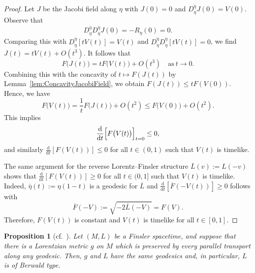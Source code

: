 \documentclass[a4paper,11pt]{article}
\numberwithin{equation}{section}
\theoremstyle{definition}
\theoremstyle{plain}
\newtheorem{proposition}[definition]{Proposition}
\newcommand{\dd}{\mathrm{d}}
\begin{document}
\begin{proof}
Let $J$ be the Jacobi field along $\eta$ with $J(0)=0$ and $D_{\dot{\eta}}^{\dot{\eta}} J(0)=V(0)$.
Observe that
\[ D_{\dot{\eta}}^{\dot{\eta}} D_{\dot{\eta}}^{\dot{\eta}} J(0) =-R_{\dot{\eta}}(0) =0. \]
Comparing this with $D_{\dot{\eta}}^{\dot{\eta}}[tV(t)] = V(t)$ and $D_{\dot{\eta}}^{\dot{\eta}} D_{\dot{\eta}}^{\dot{\eta}} [tV(t)]=0$, we find $J(t) =tV(t) +O(t^3)$.
It follows that
\[ F\bigl( J(t) \bigr) =tF\bigl( V(t) \bigr) +O(t^3) \quad \text{as}\ t \to 0. \]
Combining this with the concavity of $t \longmapsto F(J(t))$ by Lemma~\ref{lem:ConcavityJacobiField}, we obtain $F(J(t)) \le tF(V(0))$.
Hence, we have
\[ F\bigl( V(t) \bigr) =\frac{1}{t} F\bigl( J(t) \bigr) +O(t^2) \le F\bigl( V(0) \bigr) +O(t^2). \]
This implies
\[ \frac{\dd}{\dd t} \Bigl[ F\bigl( V(t) \bigr) \Bigr]_{t=0} \le 0, \]
and similarly $\frac{\dd}{\dd t}[F(V(t))] \le 0$ for all $t \in (0,1)$ such that $V(t)$ is timelike. 

The same argument for the reverse Lorentz--Finsler structure $\overline{L}(v):=L(-v)$
shows that $\frac{\dd}{\dd t}[F(V(t))] \ge 0$ for all $t \in (0,1]$ such that $V(t)$ is timelike.
Indeed, $\bar{\eta}(t):=\eta(1-t)$ is a geodesic for $\overline{L}$ and $\frac{\dd}{\dd t}[\overline{F}(-V(t))] \ge 0$ follows with
\[ \overline{F}(-V):=\sqrt{-2\overline{L}(-V)}=F(V). \]
Therefore, $F(V(t))$ is constant and $V(t)$ is timelike for all $t \in [0,1]$.
\end{proof}

\begin{proposition}[{cf.\ \cite[Proposition 4.1]{IL}}]
\label{pr:IL4.1}
Let $(M,L)$ be a Finsler spacetime,
and suppose that there is a Lorentzian metric $g$ on $M$ which is preserved
by every parallel transport along any geodesic.
Then, $g$ and $L$ have the same geodesics and, in particular, $L$ is of Berwald type.
\end{proposition}
\end{document}
